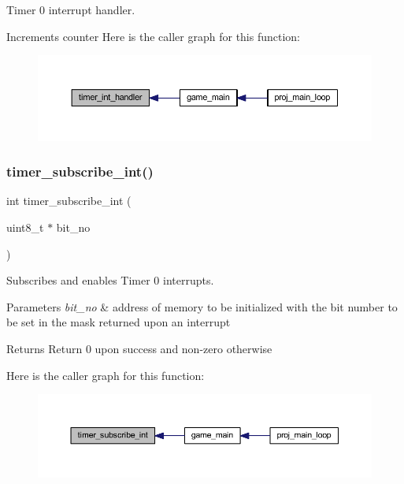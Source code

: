 Timer 0 interrupt handler. 

Increments counter Here is the caller graph for this function\+:
\nopagebreak
\begin{figure}[H]
\begin{center}
\leavevmode
\includegraphics[width=350pt]{group__timer_ga10fc9c867b15c7da6649311c9987cd17_icgraph}
\end{center}
\end{figure}
\mbox{\label{group__timer_ga6f786481e80308348d629d605ffa2d84}} 
\subsubsection{\texorpdfstring{timer\+\_\+subscribe\+\_\+int()}{timer\_subscribe\_int()}}
{\footnotesize\ttfamily int timer\+\_\+subscribe\+\_\+int (\begin{DoxyParamCaption}\item[{uint8\+\_\+t $\ast$}]{bit\+\_\+no }\end{DoxyParamCaption})}



Subscribes and enables Timer 0 interrupts. 


\begin{DoxyParams}{Parameters}
{\em bit\+\_\+no} & address of memory to be initialized with the bit number to be set in the mask returned upon an interrupt \\
\hline
\end{DoxyParams}
\begin{DoxyReturn}{Returns}
Return 0 upon success and non-\/zero otherwise 
\end{DoxyReturn}
Here is the caller graph for this function\+:
\nopagebreak
\begin{figure}[H]
\begin{center}
\leavevmode
\includegraphics[width=350pt]{group__timer_ga6f786481e80308348d629d605ffa2d84_icgraph}
\end{center}
\end{figure}
\mbox{\label{group__timer_gab9eea51549744bca5c5c923b388bb4ee}} 
